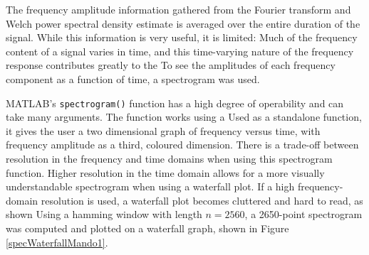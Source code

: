 \documentclass{article}
\begin{document}
            The frequency amplitude information gathered from the Fourier transform and Welch power spectral density estimate is averaged over the entire duration of the signal.
            While this information is very useful, it is limited: Much of the frequency content of a signal varies in time, and this time-varying nature of the frequency response contributes greatly to the 
            To see the amplitudes of each frequency component as a function of time, a spectrogram was used.

            MATLAB's \texttt{spectrogram()} function has a high degree of operability and can take many arguments.
            The function works using a 
            Used as a standalone function, it gives the user a two dimensional graph of frequency versus time, with frequency amplitude as a third, coloured dimension.
            There is a trade-off between resolution in the frequency and time domains when using this spectrogram function.
            Higher resolution in the time domain allows for a more visually understandable spectrogram when using a waterfall plot.
            If a high frequency-domain resolution is used, a waterfall plot becomes cluttered and hard to read, as shown 
            Using a hamming window with length $n = 2560$, a 2650-point spectrogram was computed and plotted on a waterfall graph, shown in Figure \ref{specWaterfallMando1}.
\end{document}
